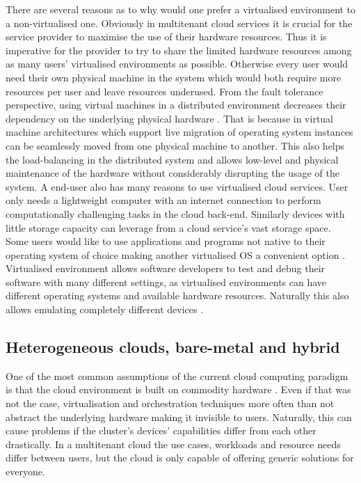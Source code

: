 There are several reasons as to why would one prefer a virtualised environment to a non-virtualised one. Obviously in multitenant cloud services it is crucial for the service provider to maximise the use of their hardware resources. Thus it is imperative for the provider to try to share the limited hardware resources among as many users' virtualised environments as possible. Otherwise every user would need their own physical machine in the system which would both require more resources per user and leave resources underused. From the fault tolerance perspective, using virtual machines in a distributed environment decreases their dependency on the underlying physical hardware \cite{Clark05livemigration}. That is because in virtual machine architectures which support live migration of operating system instances can be seamlessly moved from one physical machine to another. This also helps the load-balancing in the distributed system and allows low-level and physical maintenance of the hardware without considerably disrupting the usage of the system. A end-user also has many reasons to use virtualised cloud services. User only needs a lightweight computer with an internet connection to perform computationally challenging tasks in the cloud back-end. Similarly devices with little storage capacity can leverage from a cloud service's vast storage space. Some users would like to use applications and programs not native to their operating system of choice making another virtualised OS a convenient option \cite{ArpaciDusseau14-Book}. Virtualised environment allows software developers to test and debug their software with many different settings, as virtualised environments can have different operating systems and available hardware resources. Naturally this also allows emulating completely different devices \cite{eder2016hypervisor}.

\subsection{Heterogeneous clouds, bare-metal and hybrid}

One of the most common assumptions of the current cloud computing paradigm is that the cloud environment is built on commodity hardware \cite{Heterogeneous}. Even if that was not the case, virtualisation and orchestration techniques more often than not abstract the underlying hardware making it invisible to users. Naturally, this can cause problems if the cluster's devices' capabilities differ from each other drastically. In a multitenant cloud the use cases, workloads and resource needs differ between users, but the cloud is only capable of offering generic solutions for everyone. 

